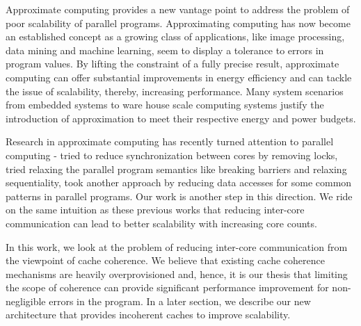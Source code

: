 \documentclass[12pt,conference]{IEEEtran}
\begin{document}
Approximate computing provides a new vantage point to address the problem
of poor scalability of parallel programs. Approximating computing has now become
an established concept
as a growing class of applications, like image processing, data mining 
and machine learning, seem to display a tolerance to errors in program values.
By lifting the constraint of a fully precise result, approximate computing
can offer substantial improvements in energy efficiency and can tackle the 
issue of scalability, thereby, increasing performance. Many system 
scenarios from embedded systems to ware house scale computing systems 
justify the introduction of approximation to meet their respective 
energy and power budgets. 

Research in approximate computing has recently turned attention to 
parallel computing - \cite{ibm} tried to reduce synchronization between cores 
by removing locks, \cite{helixup} tried relaxing the parallel program 
semantics like breaking barriers and relaxing sequentiality, \cite{paraprox}
took another approach by reducing data accesses for some common patterns in
parallel programs. Our work is another step in this direction. We ride on the
same intuition as these previous works that reducing inter-core communication
can lead to better scalability with increasing core counts. 

In this work, we look at the problem of reducing inter-core communication 
from the viewpoint of cache coherence. We believe that existing cache coherence
mechanisms are heavily overprovisioned and, hence, it is our thesis that
limiting the scope of coherence can provide significant performance improvement
for non-negligible errors in the program. In a later section, we describe
our new architecture that provides incoherent caches to improve scalability.

\end{document}
